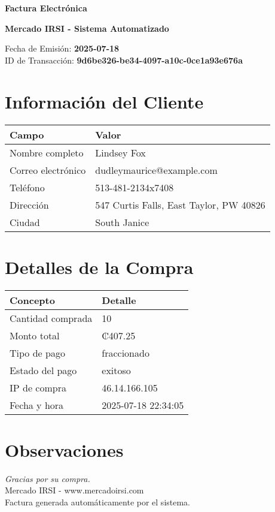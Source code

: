 \documentclass[12pt]{article}
\begin{document}
\begin{center}
    \Huge \textbf{Factura Electrónica}

    \vspace{0.3cm}
    \large \textbf{Mercado IRSI - Sistema Automatizado}

    \vspace{0.5cm}
    \normalsize Fecha de Emisión: \textbf{2025-07-18} \\
    ID de Transacción: \textbf{9d6be326-be34-4097-a10c-0ce1a93e676a} \\
\end{center}

\vspace{1cm}

\section*{Información del Cliente}
\begin{tabularx}{\textwidth}{L{4cm} L{12cm}}
\textbf{Campo} & \textbf{Valor} \\
\hline
Nombre completo & Lindsey Fox \\
Correo electrónico & dudleymaurice@example.com \\
Teléfono & 513-481-2134x7408 \\
Dirección & 547 Curtis Falls, East Taylor, PW 40826 \\
Ciudad & South Janice \\
\end{tabularx}

\vspace{0.8cm}

\section*{Detalles de la Compra}
\begin{tabularx}{\textwidth}{L{6cm} L{10cm}}
\textbf{Concepto} & \textbf{Detalle} \\
\hline
Cantidad comprada & 10 \\
Monto total & ₡407.25 \\
Tipo de pago & fraccionado \\
Estado del pago & exitoso \\
IP de compra & 46.14.166.105 \\
Fecha y hora & 2025-07-18 22:34:05 \\
\end{tabularx}

\vspace{1.5cm}

\section*{Observaciones}


\vfill

\begin{center}
    \textit{Gracias por su compra.} \\
    Mercado IRSI - www.mercadoirsi.com \\
    Factura generada automáticamente por el sistema.
\end{center}
\end{document}
